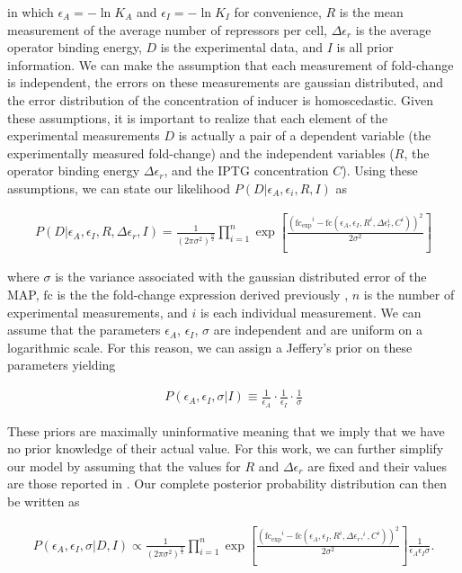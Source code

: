 in which $\epsilon_A = -\ln K_A$ and
$\epsilon_I = -\ln K_I$ for convenience, $R$ is the mean measurement of the average number of
repressors per cell, $\Delta\epsilon_r$ is the average operator binding energy, $D$ is the experimental data, and $I$ is all prior
information. We can make the assumption that each measurement of fold-change
is independent, the errors on these measurements are gaussian distributed, and
the error distribution of the concentration of inducer is homoscedastic. Given
these assumptions, it is important to realize that each element of the
experimental measurements $D$ is actually a pair of a dependent variable (the
experimentally measured fold-change) and the independent variables ($R$, the
operator binding energy $\Delta\epsilon_r$, and the IPTG concentration $C$). Using these assumptions, we can state our likelihood $P(D \vert \epsilon_A, \epsilon_i, R, I)$ as

\begin{align}
P(D \vert \epsilon_A, \epsilon_I, R, \Delta\epsilon_r, I) =
\frac{1}{(2\pi\sigma^2)^{\frac{n}{2}}}\prod\limits_{i=1}^n\exp\left[\frac{(\mathrm{fc_{exp}}^i -
\mathrm{fc}(\epsilon_A, \epsilon_I, R^i, \Delta\epsilon_r^i,
C^i))^2}{2\sigma^2}\right]
\end{align}

where $\sigma$ is the variance associated with the gaussian distributed error
of the MAP, $\mathrm{fc}$ is the the fold-change expression derived previously
, $n$ is the number of experimental measurements, and $i$ is each
individual measurement. We can assume that the parameters $\epsilon_A$,
$\epsilon_I$, $\sigma$ are independent and are uniform on a logarithmic scale.
For this reason, we can assign a Jeffery's prior on these parameters yielding

\begin{align}
P(\epsilon_A, \epsilon_I, \sigma \vert I) \equiv
\frac{1}{\epsilon_A}\cdot\frac{1}{\epsilon_I}\cdot\frac{1}{\sigma}
\end{align}

These priors are maximally uninformative meaning that we imply that we have no
prior knowledge of their actual value. For this work, we can further simplify
our model by assuming that the values for $R$ and $\Delta\epsilon_r$ are fixed
and their values are those reported in \citep{Garcia2011}. Our complete posterior probability distribution can then be written as

\begin{align}
P(\epsilon_A, \epsilon_I, \sigma \vert D, I) \propto
\frac{1}{(2\pi\sigma^2)^\frac{n}{2}}\prod\limits_{i =
1}^n\exp\left[\frac{(\mathrm{fc_{exp}}^i - \mathrm{fc}(\epsilon_A, \epsilon_I,
R^i, \Delta\epsilon_r,^i,
C^i))^2}{2\sigma^2}\right]\frac{1}{\epsilon_A\epsilon_I\sigma}.
\end{align}

